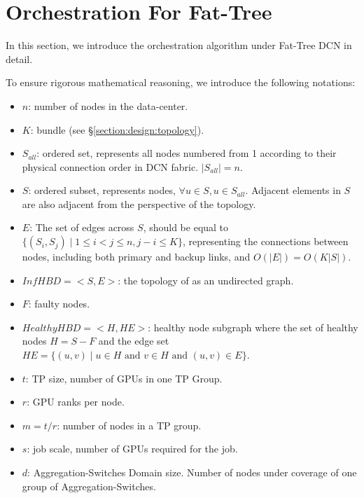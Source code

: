 \section{Orchestration For Fat-Tree}
\label{appendix:orch-algo}
In this section, we introduce the orchestration algorithm under Fat-Tree DCN in detail.

\label{appendix:orch-algo:notation}
To ensure rigorous mathematical reasoning, we introduce the following notations:

\begin{itemize}
    \item {
        $n$: number of nodes in the data-center.
    }
    \item {
        $K$: \docs{} bundle (see \S\ref{section:design:topology}).
    }
    \item {
        $S_{all}$: ordered set, represents all nodes numbered from 1 according to their physical connection order in DCN fabric. $|S_{all}|=n$.
    }
    \item {
        $S$: ordered subset, represents nodes, $\forall u \in S, u \in S_{all}$. Adjacent elements in $S$ are also adjacent from the perspective of the \SYS{} topology. 
    }
    \item{
        $E$: The set of edges across $S$, should be equal to $\{ (S_i, S_j) \mid 1 \leq i < j \leq n, j - i \leq K \} $, representing the connections between nodes, including both primary and backup links, and $O(|E|) = O(K|S|)$.
    }
    \item {
        $InfHBD=<S,E>$: the topology of \SYS{} as an undirected graph.
    }
    \item {
        $F$: faulty nodes.
    }
    \item {
        $HealthyHBD=<H,HE>$: healthy node subgraph where the set of healthy nodes $H = S - F$ and the edge set $HE = \{ (u, v) \mid u \in H \text{ and } v \in H \text{ and } (u, v) \in E \}$.
    }
    \item{
        $t$: TP size, number of GPUs in one TP Group.
    }
    \item{
        $r$: GPU ranks per node.
    }
    \item{
        $m=t/r$: number of nodes in a TP group.
    }
    \item{
        $s$: job scale, number of GPUs required for the job.
    }
    \item{
        $d$: Aggregation-Switches Domain size. Number of nodes under coverage of one group of Aggregation-Switches.
}
\end{itemize}
